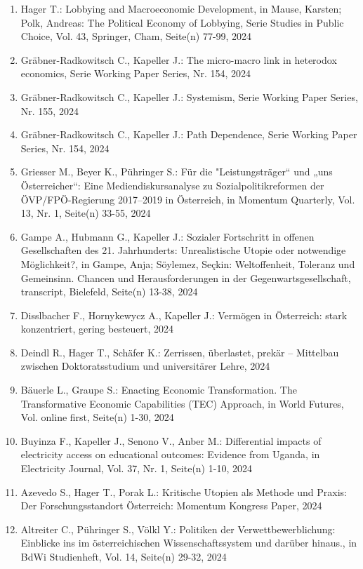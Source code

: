 \begin{enumerate}
	 \item Hager T.: Lobbying and Macroeconomic Development, in Mause, Karsten; Polk, Andreas: The Political Economy of Lobbying, Serie Studies in Public Choice, Vol. 43, Springer, Cham, Seite(n) 77-99, 2024
	 \item Gräbner-Radkowitsch C., Kapeller J.: The micro-macro link in heterodox economics, Serie Working Paper Series, Nr. 154, 2024
	 \item Gräbner-Radkowitsch C., Kapeller J.: Systemism, Serie Working Paper Series, Nr. 155, 2024
	 \item Gräbner-Radkowitsch C., Kapeller J.: Path Dependence, Serie Working Paper Series, Nr. 154, 2024
	 \item Griesser M., Beyer K., Pühringer S.: Für die "Leistungsträger“ und „uns Österreicher“: Eine Mediendiskursanalyse zu Sozialpolitikreformen der ÖVP/FPÖ-Regierung 2017–2019 in Österreich, in Momentum Quarterly, Vol. 13, Nr. 1, Seite(n) 33-55, 2024
	 \item Gampe A., Hubmann G., Kapeller J.: Sozialer Fortschritt in offenen Gesellschaften des 21. Jahrhunderts: Unrealistische Utopie oder notwendige Möglichkeit?, in Gampe, Anja; Söylemez, Seçkin: Weltoffenheit, Toleranz und Gemeinsinn. Chancen und Herausforderungen in der Gegenwartsgesellschaft, transcript, Bielefeld, Seite(n) 13-38, 2024
	 \item Disslbacher F., Hornykewycz A., Kapeller J.: Vermögen in Österreich: stark konzen­triert, gering be­steuert, 2024
	 \item Deindl R., Hager T., Schäfer K.: Zerrissen, überlastet, prekär – Mittelbau zwischen Doktoratsstudium und universitärer Lehre, 2024
	 \item Bäuerle L., Graupe S.: Enacting Economic Transformation. The Transformative Economic Capabilities (TEC) Approach, in World Futures, Vol. online first, Seite(n) 1-30, 2024
	 \item Buyinza F., Kapeller J., Senono V., Anber M.: Differential impacts of electricity access on educational outcomes: Evidence from Uganda, in Electricity Journal, Vol. 37, Nr. 1, Seite(n) 1-10, 2024
	 \item Azevedo S., Hager T., Porak L.: Kritische Utopien als Methode und Praxis: Der Forschungsstandort Österreich: Momentum Kongress Paper, 2024
	 \item Altreiter C., Pühringer S., Völkl Y.: Politiken der Verwettbewerblichung: Einblicke ins im österreichischen Wissenschaftssystem und darüber hinaus., in BdWi Studienheft, Vol. 14, Seite(n) 29-32, 2024
\end{enumerate}
